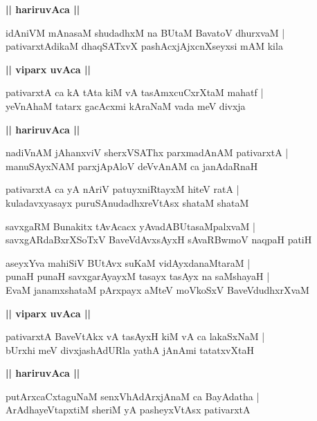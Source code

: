 \documentclass[twoside,12pt,openright]{book}
\newcounter{shloka}[chapter]
\def\uvaca#1{\centerline{{\large\textbf{#1}}}}
\begin{document}
\uvaca{|| hariruvAca ||}

\begin{shloka}%
idAniVM mAnasaM shudadhxM na BUtaM BavatoV dhurxvaM |\\
pativarxtAdikaM dhaqSATxvX pashAcxjAjxcnXseyxsi mAM kila
\end{shloka}

\uvaca{|| viparx uvAca ||}

\begin{shloka}%
pativarxtA ca kA tAta kiM vA tasAmxcuCxrXtaM mahatf |\\
yeVnAhaM tatarx gacAcxmi kAraNaM vada meV divxja 
\end{shloka}

\uvaca{|| hariruvAca ||}

\begin{shloka}%
nadiVnAM jAhanxviV sherxVSAThx parxmadAnAM pativarxtA |\\
manuSAyxNAM parxjApAloV deVvAnAM ca janAdaRnaH
\end{shloka}

\begin{shloka}%
pativarxtA ca yA nAriV patuyxniRtayxM hiteV ratA |\\
kuladavxyasayx puruSAnudadhxreVtAsx shataM shataM 
\end{shloka}

\begin{shloka}%
savxgaRM Bunakitx tAvAcacx yAvadABUtasaMpalxvaM |\\
savxgARdaBxrXSoTxV BaveVdAvxsAyxH sAvaRBwmoV naqpaH patiH 
\end{shloka}

\begin{shloka}%
aseyxYva mahiSiV BUtAvx suKaM vidAyxdanaMtaraM |\\
punaH punaH savxgarAyayxM tasayx tasAyx na saMshayaH |\\
EvaM janamxshataM pArxpayx aMteV moVkoSxV BaveVdudhxrXvaM 
\end{shloka}

\uvaca{|| viparx uvAca ||}

\begin{shloka}%
pativarxtA BaveVtAkx vA tasAyxH kiM vA ca lakaSxNaM |\\
bUrxhi meV divxjashAdURla yathA jAnAmi tatatxvXtaH 
\end{shloka}

\uvaca{|| hariruvAca ||}

\begin{shloka}%
putArxcaCxtaguNaM senxVhAdArxjAnaM ca BayAdatha |\\
ArAdhayeVtapxtiM sheriM yA pasheyxVtAsx pativarxtA 
\end{shloka}
\end{document}
